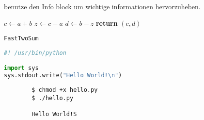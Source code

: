 \documentclass[12pt]{article}
\begin{document}
\begin{info} %
	benutze den Info block um wichtige informationen hervorzuheben.
\end{info}


\begin{center}
	\begin{minipage}{0.5\linewidth} %
		\begin{algorithm}[H]
			\medskip
			$c \leftarrow a + b$ \;
			$z \leftarrow c - a$ \;
			$d \leftarrow b - z$ \;
			{\bf return} $(c,d)$ \;
			\caption{\texttt{FastTwoSum}} %
			\label{alg:fastTwoSum}   %
		\end{algorithm}
	\end{minipage}
\end{center}


\begin{file}[hello.py]
\begin{lstlisting}[language=Python]
#! /usr/bin/python

import sys
sys.stdout.write("Hello World!\n")
\end{lstlisting}
\end{file}



\begin{commandline}
	\begin{verbatim}
		$ chmod +x hello.py
		$ ./hello.py

		Hello World!S
	\end{verbatim}
\end{commandline}
\end{document}
